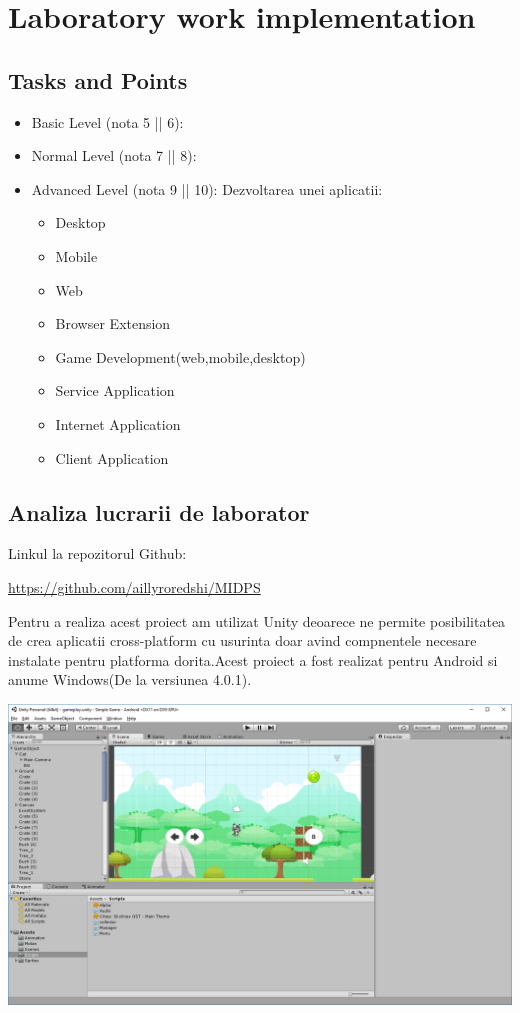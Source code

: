 \section{Laboratory work implementation}

\subsection{Tasks and Points}
\begin{itemize}
	\item Basic Level (nota 5 || 6):
	
	\item Normal Level (nota 7 || 8):
	
	\item Advanced Level (nota 9 || 10):
	Dezvoltarea unei aplicatii: 
	\begin{itemize}
		\item Desktop
    	\item Mobile	
    	\item Web
    	\item Browser Extension
    	\item Game Development(web,mobile,desktop)
    	\item Service Application
    	\item Internet Application
    	\item Client Application
	\end{itemize}
\end{itemize}
    



\subsection{Analiza lucrarii de laborator}

Linkul la repozitorul Github:\\
\begin{center}
\url{https://github.com/aillyroredshi/MIDPS}
\end{center}

Pentru a realiza acest proiect am utilizat Unity deoarece ne permite posibilitatea de crea aplicatii cross-platform cu usurinta doar avind compnentele necesare instalate pentru platforma dorita.Acest proiect a fost realizat pentru Android si anume Windows(De la versiunea 4.0.1).
\begin{center}
\includegraphics[scale=0.5]{images/1}
\end{center}

